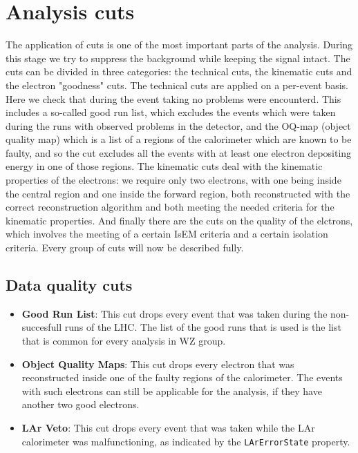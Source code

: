 \section{Analysis cuts}
\label{sec:Sel_cuts}

The application of cuts is one of the most important parts of the analysis. During this stage we try to suppress the background while keeping the signal intact. The cuts can be divided in three categories: the technical cuts, the kinematic cuts and the electron "goodness" cuts. The technical cuts are applied on a per-event basis. Here we check that during the event taking no problems were encounterd. This includes a so-called good run list, which excludes the events which were taken during the runs with observed problems in the detector, and the OQ-map (object quality map) which is a list of a regions of the calorimeter which are known to be faulty, and so the cut excludes all the events with at least one electron depositing energy in one of those regions. The kinematic cuts deal with the kinematic properties of the electrons: we require only two electrons, with one being inside the central region and one inside the forward region, both reconstructed with the correct reconstruction algorithm and both meeting the needed criteria for the kinematic properties. And finally there are the cuts on the quality of the elctrons, which involves the meeting of a certain IsEM criteria and a certain isolation criteria. Every group of cuts will now be described fully.

\subsection{Data quality cuts}
\label{sec:Sel_GRL_OQ}

\begin{itemize}
\item {\bfseries Good Run List}: This cut drops every event that was taken during the non-succesfull runs of the LHC. The list of the good runs that is used is the list that is common for every analysis in WZ group.
\item {\bfseries Object Quality Maps}: This cut drops every electron that was reconstructed inside one of the faulty regions of the calorimeter. The events with such electrons can still be applicable for the analysis, if they have another two good electrons.
\item {\bfseries LAr Veto}: This cut drops every event that was taken while the LAr calorimeter was malfunctioning, as indicated by the \texttt{LArErrorState} property.
\end{itemize}

